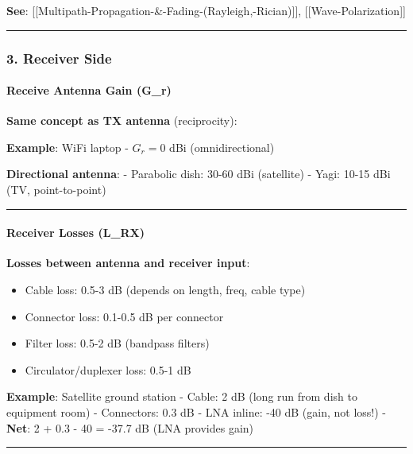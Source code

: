 \textbf{See}:
{[}{[}Multipath-Propagation-\&-Fading-(Rayleigh,-Rician){]}{]},
{[}{[}Wave-Polarization{]}{]}

\begin{center}\rule{0.5\linewidth}{0.5pt}\end{center}

\subsubsection{3. Receiver Side}\label{receiver-side}

\paragraph{Receive Antenna Gain (G\_r)}\label{receive-antenna-gain-g_r}

\textbf{Same concept as TX antenna} (reciprocity):

\textbf{Example}: WiFi laptop - \(G_r = 0\) dBi (omnidirectional)

\textbf{Directional antenna}: - Parabolic dish: 30-60 dBi (satellite) -
Yagi: 10-15 dBi (TV, point-to-point)

\begin{center}\rule{0.5\linewidth}{0.5pt}\end{center}

\paragraph{Receiver Losses (L\_RX)}\label{receiver-losses-l_rx}

\textbf{Losses between antenna and receiver input}:

\begin{itemize}
\tightlist
\item
  Cable loss: 0.5-3 dB (depends on length, freq, cable type)
\item
  Connector loss: 0.1-0.5 dB per connector
\item
  Filter loss: 0.5-2 dB (bandpass filters)
\item
  Circulator/duplexer loss: 0.5-1 dB
\end{itemize}

\textbf{Example}: Satellite ground station - Cable: 2 dB (long run from
dish to equipment room) - Connectors: 0.3 dB - LNA inline: -40 dB (gain,
not loss!) - \textbf{Net}: 2 + 0.3 - 40 = -37.7 dB (LNA provides gain)

\begin{center}\rule{0.5\linewidth}{0.5pt}\end{center}

